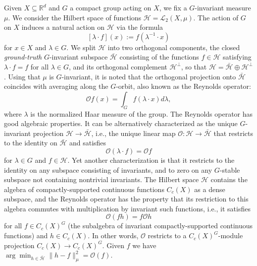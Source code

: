\documentclass[twoside,11pt]{article}
\begin{document}
Given $X\subseteq \mathbb R^d$ and $G$ a compact group acting on $X$, we fix a $G$-invariant measure $\mu$. We consider the Hilbert space of functions $\mathcal H=\mathscr L_2(X, \mu)$. The action of $G$ on $X$ induces a natural action on $\mathcal H$ via the formula
\[
[\lambda\cdot f](x) := f(\lambda^{-1}\cdot x)
\]
for $x\in X$ and $\lambda \in G$. We split $\mathcal H$ into two orthogonal components, the closed \emph{ground-truth} $G$-invariant subspace $\bar{ \mathcal H}$ consisting of the functions $f\in\mathcal H$ satisfying $\lambda\cdot f = f$ for all $\lambda\in G$, and its orthogonal complement $\mathcal H^\perp$, so that $\mathcal H = \bar{ \mathcal H }\oplus \mathcal H^\perp$. Using that $\mu$ is $G$-invariant, it is noted \citep{elesedy2021provably} that the orthogonal projection onto $\bar{ \mathcal H}$ coincides with averaging along the $G$-orbit, also known as the Reynolds operator:
\begin{equation} \label{eq.projection}
    \mathcal O f(x) = \int_{G} f(\lambda \cdot x) d\lambda,
\end{equation}
where $\lambda$ is the normalized Haar measure of the group. The Reynolds operator has good algebraic properties. It can be alternatively characterized as the unique $G$-invariant projection $\mathcal H \rightarrow \bar {\mathcal H}$, i.e., the unique linear map $\mathcal O: \mathcal H \rightarrow \bar {\mathcal H}$ that restricts to the identity on $\bar {\mathcal H}$ and satisfies 
\begin{equation}
\mathcal O (\lambda \cdot f) = \mathcal O f
\end{equation}
for $\lambda \in G$ and $f\in \mathcal H$. Yet another characterization is that it restricts to the identity on any subspace consisting of invariants, and to zero on any $G$-stable subspace not containing nontrivial invariants. The Hilbert space $\mathcal H$ contains the algebra of compactly-supported continuous functions $C_c(X)$ as a dense subspace, and the Reynolds operator has the property that its restriction to this algebra commutes with multiplication by invariant such functions, i.e., it satisfies
\begin{equation}
    \mathcal O (fh) = f\mathcal O h
\end{equation}
for all $f\in C_c(X)^G$ (the subalgebra of invariant compactly-supported continuous functions) and $h\in C_c(X)$. In other words, $\mathcal O$ restricts to a $C_c(X)^G$-module projection $C_c(X)\rightarrow C_c(X)^G$.
Given $f$ we have
$\arg\min_{h \in \bar {\mathcal H}} \| h - f\|_{\mu}^2 =\mathcal O(f)$.
\end{document}
